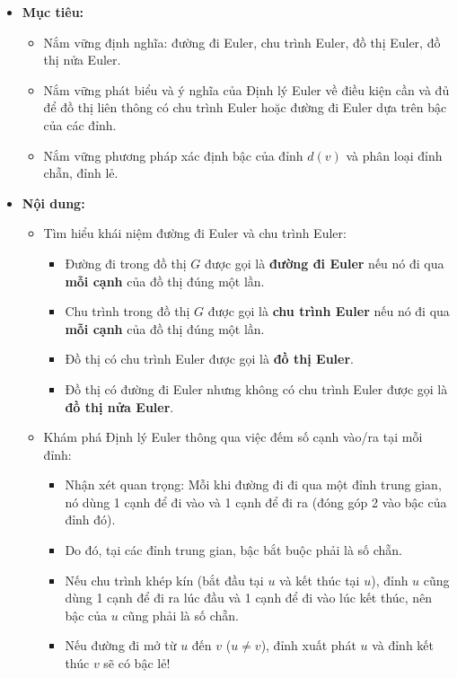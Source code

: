 \documentclass[12pt, a4paper]{article}
\begin{document}
\begin{itemize}[leftmargin=1.2cm]
    \item[a)] \textbf{Mục tiêu:}
    \begin{itemize}[leftmargin=0.6cm]
        \item Nắm vững định nghĩa: đường đi Euler, chu trình Euler, đồ thị Euler, đồ thị nửa Euler.
        \item Nắm vững phát biểu và ý nghĩa của Định lý Euler về điều kiện cần và đủ để đồ thị liên thông có chu trình Euler hoặc đường đi Euler dựa trên bậc của các đỉnh.
        \item Nắm vững phương pháp xác định bậc của đỉnh $d(v)$ và phân loại đỉnh chẵn, đỉnh lẻ.
    \end{itemize}

    \item[b)] \textbf{Nội dung:}
    \begin{itemize}[leftmargin=0.6cm]
        \item Tìm hiểu khái niệm đường đi Euler và chu trình Euler:
        \begin{itemize}
            \item Đường đi trong đồ thị $G$ được gọi là \textbf{đường đi Euler} nếu nó đi qua \textbf{mỗi cạnh} của đồ thị đúng một lần.
            \item Chu trình trong đồ thị $G$ được gọi là \textbf{chu trình Euler} nếu nó đi qua \textbf{mỗi cạnh} của đồ thị đúng một lần.
            \item Đồ thị có chu trình Euler được gọi là \textbf{đồ thị Euler}.
            \item Đồ thị có đường đi Euler nhưng không có chu trình Euler được gọi là \textbf{đồ thị nửa Euler}.
        \end{itemize}
        \item Khám phá Định lý Euler thông qua việc đếm số cạnh vào/ra tại mỗi đỉnh:
        \begin{itemize}
            \item Nhận xét quan trọng: Mỗi khi đường đi đi qua một đỉnh trung gian, nó dùng 1 cạnh để đi vào và 1 cạnh để đi ra (đóng góp 2 vào bậc của đỉnh đó).
            \item Do đó, tại các đỉnh trung gian, bậc bắt buộc phải là số chẵn.
            \item Nếu chu trình khép kín (bắt đầu tại $u$ và kết thúc tại $u$), đỉnh $u$ cũng dùng 1 cạnh để đi ra lúc đầu và 1 cạnh để đi vào lúc kết thúc, nên bậc của $u$ cũng phải là số chẵn.
            \item Nếu đường đi mở từ $u$ đến $v$ ($u \neq v$), đỉnh xuất phát $u$ và đỉnh kết thúc $v$ sẽ có bậc lẻ!

\end{itemize}
\end{itemize}
\end{itemize}
\end{document}
